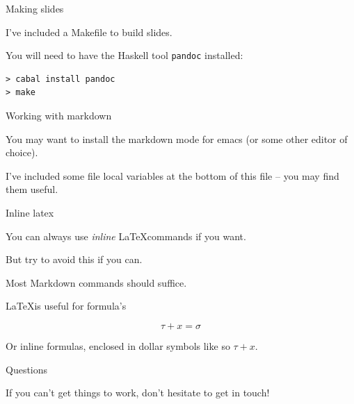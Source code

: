 \documentclass[ignorenonframetext,]{beamer}
\begin{document}
\begin{frame}[fragile]{%
\protect\hypertarget{making-slides}{%
Making slides}}

I’ve included a Makefile to build slides.

You will need to have the Haskell tool \texttt{pandoc} installed:

\begin{verbatim}
> cabal install pandoc
> make
\end{verbatim}

\end{frame}

\begin{frame}{%
\protect\hypertarget{working-with-markdown}{%
Working with markdown}}

You may want to install the markdown mode for emacs (or some other
editor of choice).

I’ve included some file local variables at the bottom of this file – you
may find them useful.

\end{frame}

\begin{frame}{%
\protect\hypertarget{inline-latex}{%
Inline latex}}

You can always use \emph{inline} \LaTeX commands if you want.

But try to avoid this if you can.

Most Markdown commands should suffice.

\LaTeX is useful for formula’s

\begin{equation}
\tau + x = \sigma
\end{equation}

Or inline formulas, enclosed in dollar symbols like so \(\tau + x\).

\end{frame}

\begin{frame}{%
\protect\hypertarget{questions}{%
Questions}}

If you can’t get things to work, don’t hesitate to get in touch!

\end{frame}
\end{document}
